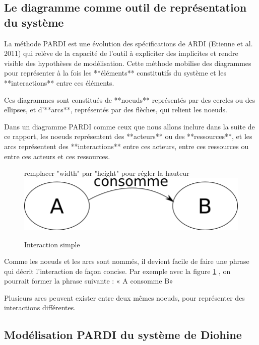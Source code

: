 \subsection{Le diagramme  comme outil de représentation du système}

La méthode PARDI est une évolution des spécifications de ARDI (Etienne et al. 2011) qui relève de la capacité de l'outil à expliciter des implicites et rendre visible des  hypothèses de modélisation. Cette méthode mobilise des diagrammes pour représenter à la fois les **éléments** constitutifs du système et les **interactions** entre ces éléments. 

Ces diagrammes sont constitués de **noeuds** représentés par des cercles ou des ellipses, et d'**arcs**, représentés par des flèches, qui relient les noeuds. 

Dans un diagramme PARDI comme ceux que nous allons inclure dans la suite de ce rapport, les noeuds représentent des **acteurs** ou des **ressources**, et les arcs représentent des **interactions** entre ces acteurs, entre ces ressources ou entre ces acteurs et ces ressources.

\begin{figure}
\begin{center}
remplacer "width" par "height" pour régler la hauteur
\includegraphics[width=15cm]{img/diagramme_simple.png}
\end{center}
\caption{Interaction simple }
\label{simple_interac}
\end{figure}



Comme les noeuds et les arcs sont nommés, il devient facile de faire une phrase qui décrit l'interaction de façon concise. Par exemple avec la figure \ref{simple_interac} , on pourrait former la phrase suivante : « A consomme B»

Plusieurs arcs peuvent exister entre deux mêmes noeuds, pour représenter des interactions différentes.


\subsection{Modélisation PARDI du système de Diohine}

